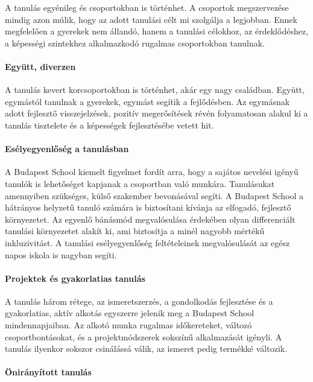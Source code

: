 A tanulás egyénileg és csoportokban is történhet. A csoportok
megszervezése mindig azon múlik, hogy az adott tanulási célt mi
szolgálja a legjobban. Ennek megfelelően a gyerekek nem állandó, hanem a
tanulási célokhoz, az érdeklődéshez, a képességi szintekhez alkalmazkodó
rugalmas csoportokban tanulnak.

\paragraph{Együtt, diverzen}

A tanulás kevert korcsoportokban is történhet, akár egy nagy családban. Együtt, egymástól tanulnak a gyerekek, egymást segítik a fejlődésben. Az egymásnak adott fejlesztő visszejelzések, pozitív megerősítések révén folyamatosan alakul ki a tanulás tisztelete és a képességek fejlesztésébe vetett hit.

\paragraph{Esélyegyenlőség a
tanulásban}

A Budapest School kiemelt figyelmet fordít arra, hogy a sajátos nevelési
igényű tanulók is lehetőséget kapjanak a csoportban való munkára.
Tanulásukat amennyiben szükséges, külső szakember bevonásával segíti. A
Budapest School a hátrányos helyzetű tanuló számára is biztosítani
kívánja az elfogadó, fejlesztő környezetet. Az egyenlő bánásmód
megvalósulása érdekében olyan differenciált tanulási környezetet alakít
ki, ami biztosítja a minél nagyobb mértékű inkluzivitást. A tanulási
esélyegyenlőség feltételeinek megvalósulását az egész napos iskola is
nagyban segíti.

\paragraph{Projektek és gyakorlatias
tanulás}

A tanulás három rétege, az ismeretszerzés, a gondolkodás fejlesztése és
a gyakorlatias, aktív alkotás egyszerre jelenik meg a Budapest School
mindennapjaiban. Az alkotó munka rugalmas időkereteket, változó
csoportbontásokat, és a projektmódszerek sokszínű alkalmazását igényli.
A tanulás ilyenkor sokszor csinálássá válik, az ismeret pedig termékké
változik.

\paragraph{Önirányított
tanulás}

